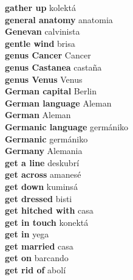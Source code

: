 \textbf{ gather up  } kolektá \\
\textbf{ general anatomy  } anatomia \\
\textbf{ Genevan  } calvinista \\
\textbf{ gentle wind  } brisa \\
\textbf{ genus Cancer  } Cancer \\
\textbf{ genus Castanea  } castaña \\
\textbf{ genus Venus  } Venus \\
\textbf{ German capital  } Berlin \\
\textbf{ German language  } Aleman \\
\textbf{ German  } Aleman \\
\textbf{ Germanic language  } germániko \\
\textbf{ Germanic  } germániko \\
\textbf{ Germany  } Alemania \\
\textbf{ get a line  } deskubrí \\
\textbf{ get across  } amanesé \\
\textbf{ get down  } kuminsá \\
\textbf{ get dressed  } bisti \\
\textbf{ get hitched with  } casa \\
\textbf{ get in touch  } konektá \\
\textbf{ get in  } yega \\
\textbf{ get married  } casa \\
\textbf{ get on  } barcando \\
\textbf{ get rid of  } abolí \\
